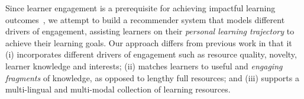 \documentclass[letterpaper]{article} %
\begin{document}

 Since learner engagement is a prerequisite for achieving impactful learning outcomes~\cite{lan2017behavior}, we attempt to build a recommender system that models different drivers of engagement, 
assisting learners on their \emph{personal learning trajectory} to achieve their learning goals. Our approach differs from previous work in that it (i) incorporates different drivers of engagement such as resource quality, novelty, learner knowledge and interests; (ii) matches learners to useful and \emph{engaging fragments} of knowledge, as opposed to lengthy full resources; and (iii) supports a multi-lingual and multi-modal collection of learning resources.   
\end{document}
